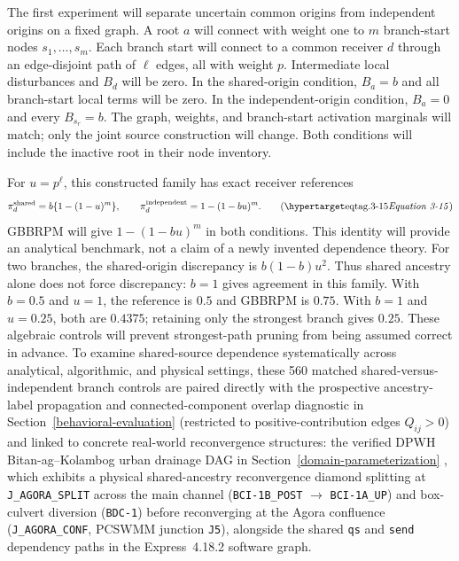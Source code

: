 The first experiment will separate uncertain common origins from independent
origins on a fixed graph. A root $a$ will connect with weight one to $m$
branch-start nodes $s_1,\ldots,s_m$. Each branch start will connect to a
common receiver $d$ through an edge-disjoint path of $\ell$ edges, all with
weight $p$. Intermediate local disturbances and $B_d$ will be zero. In the
shared-origin condition, $B_a=b$ and all branch-start local terms will be
zero. In the independent-origin condition, $B_a=0$ and every $B_{s_r}=b$.
The graph, weights, and branch-start activation marginals will match; only
the joint source construction will change. Both conditions will include
the inactive root in their node inventory.

For $u=p^\ell$, this constructed family has exact receiver references
\[
\pi_d^{\mathrm{shared}}=b\{1-(1-u)^m\},\qquad
\pi_d^{\mathrm{independent}}=1-(1-bu)^m.
\eqtag{3-15}
\]
GBBRPM will give $1-(1-bu)^m$ in both conditions. This identity will provide
an analytical benchmark, not a claim of a newly invented dependence theory.
For two branches, the shared-origin discrepancy is $b(1-b)u^2$.
Thus shared ancestry alone does not force discrepancy: $b=1$ gives
agreement in this family. With $b=0.5$ and $u=1$, the reference is $0.5$
and GBBRPM is $0.75$. With $b=1$ and $u=0.25$, both are $0.4375$;
retaining only the strongest branch gives $0.25$. These algebraic controls
will prevent strongest-path pruning from being assumed correct in advance.
To examine shared-source dependence systematically across analytical,
algorithmic, and physical settings, these 560 matched shared-versus-independent
branch controls are paired directly with the prospective ancestry-label
propagation and connected-component overlap diagnostic in
Section~\ref{behavioral-evaluation} (restricted to positive-contribution
edges $Q_{ij}>0$) and linked to concrete real-world reconvergence
structures: the verified DPWH Bitan-ag--Kolambog urban drainage DAG in
Section~\ref{domain-parameterization} \citep{dpwh2026foi,upplanades2016},
which exhibits a physical shared-ancestry reconvergence diamond splitting at
\texttt{J\_\allowbreak AGORA\_\allowbreak SPLIT} across the main channel
(\texttt{BCI-1B\_\allowbreak POST} $\to$ \texttt{BCI-1A\_\allowbreak UP})
and box-culvert diversion (\texttt{BDC-1}) before reconverging at the Agora
confluence (\texttt{J\_\allowbreak AGORA\_\allowbreak CONF}, PCSWMM
junction \texttt{J5}), alongside the shared \texttt{qs} and \texttt{send}
dependency paths in the Express~4.18.2 software graph.

